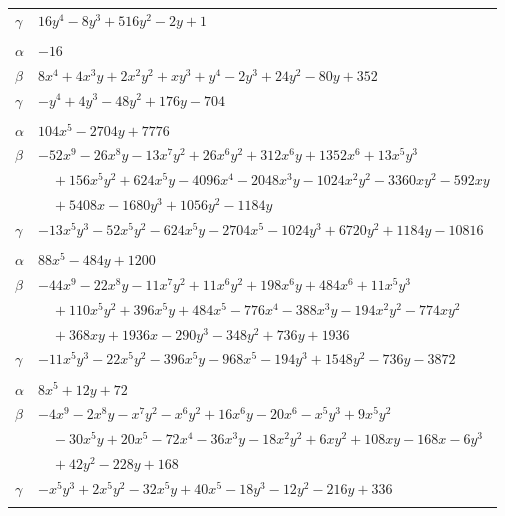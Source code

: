 \documentclass[11pt]{article}
\begin{document}
\begin{longtable}{@{}ll@{}}
$\gamma$ & $16y^{4}-8y^{3}+516y^{2}-2y+1$\\
\addlinespace[3pt]
\multicolumn{2}{@{}l}{$\{i,j\}=\{11,16\}$, $k_{ij}=2^{6}\cdot 3\cdot 7$}\\
$\alpha$ & $-16$\\
$\beta$ & $8x^{4}+4x^{3}y+2x^{2}y^{2}+xy^{3}+y^{4}-2y^{3}+24y^{2}-80y+352$\\
$\gamma$ & $-y^{4}+4y^{3}-48y^{2}+176y-704$\\
\addlinespace[3pt]
\multicolumn{2}{@{}l}{$\{i,j\}=\{11,17\}$, $k_{ij}=2^{7}\cdot 3^{5}$}\\
$\alpha$ & $104x^{5}-2704y+7776$\\
$\beta$ & $-52x^{9}-26x^{8}y-13x^{7}y^{2}+26x^{6}y^{2}+312x^{6}y+1352x^{6}+13x^{5}y^{3}$\\
 & $\quad +156x^{5}y^{2}+624x^{5}y-4096x^{4}-2048x^{3}y-1024x^{2}y^{2}-3360xy^{2}-592xy$\\
 & $\quad +5408x-1680y^{3}+1056y^{2}-1184y$\\
$\gamma$ & $-13x^{5}y^{3}-52x^{5}y^{2}-624x^{5}y-2704x^{5}-1024y^{3}+6720y^{2}+1184y-10816$\\
\addlinespace[3pt]
\multicolumn{2}{@{}l}{$\{i,j\}=\{11,25\}$, $k_{ij}=2^{6}\cdot 3\cdot 5^{2}$}\\
$\alpha$ & $88x^{5}-484y+1200$\\
$\beta$ & $-44x^{9}-22x^{8}y-11x^{7}y^{2}+11x^{6}y^{2}+198x^{6}y+484x^{6}+11x^{5}y^{3}$\\
 & $\quad +110x^{5}y^{2}+396x^{5}y+484x^{5}-776x^{4}-388x^{3}y-194x^{2}y^{2}-774xy^{2}$\\
 & $\quad +368xy+1936x-290y^{3}-348y^{2}+736y+1936$\\
$\gamma$ & $-11x^{5}y^{3}-22x^{5}y^{2}-396x^{5}y-968x^{5}-194y^{3}+1548y^{2}-736y-3872$\\
\addlinespace[3pt]
\multicolumn{2}{@{}l}{$\{i,j\}=\{11,26\}$, $k_{ij}=2^{4}\cdot 3\cdot 13$}\\
$\alpha$ & $8x^{5}+12y+72$\\
$\beta$ & $-4x^{9}-2x^{8}y-x^{7}y^{2}-x^{6}y^{2}+16x^{6}y-20x^{6}-x^{5}y^{3}+9x^{5}y^{2}$\\
 & $\quad -30x^{5}y+20x^{5}-72x^{4}-36x^{3}y-18x^{2}y^{2}+6xy^{2}+108xy-168x-6y^{3}$\\
 & $\quad +42y^{2}-228y+168$\\
$\gamma$ & $-x^{5}y^{3}+2x^{5}y^{2}-32x^{5}y+40x^{5}-18y^{3}-12y^{2}-216y+336$\\
\addlinespace[3pt]
\multicolumn{2}{@{}l}{$\{i,j\}=\{12,26\}$, $k_{ij}=2^{3}\cdot 3^{3}\cdot 11^{2}\cdot 13$}\\

\end{longtable}
\end{document}
